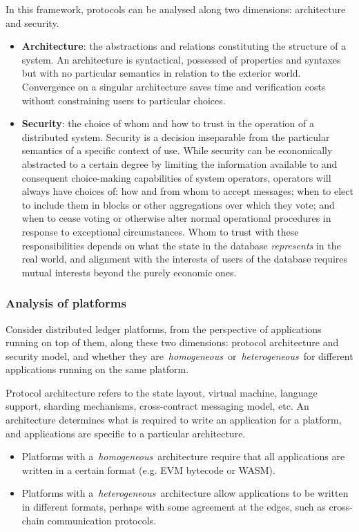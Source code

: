 \documentclass[
    9pt,            %
    commun,        %
    affiltop,       %
]{art}
\begin{document}
In this framework, protocols can be analysed along two dimensions:
architecture and security.

\begin{itemize}
\item
  \textbf{Architecture}: the abstractions and relations constituting the
  structure of a system. An architecture is syntactical, possessed of
  properties and syntaxes but with no particular semantics in relation to
  the exterior world. Convergence on a singular architecture saves time and
  verification costs without constraining users to particular choices.
\item
  \textbf{Security}: the choice of whom and how to trust in the operation
  of a distributed system. Security is a decision inseparable from the
  particular semantics of a specific context of use. While security can be
  economically abstracted to a certain degree by limiting the information
  available to and consequent choice-making capabilities of system
  operators, operators will always have choices of: how and from whom to
  accept messages; when to elect to include them in blocks or other
  aggregations over which they vote; and when to cease voting or otherwise
  alter normal operational procedures in response to exceptional
  circumstances. Whom to trust with these responsibilities depends on what
  the state in the database \emph{represents} in the real world, and
  alignment with the interests of users of the database requires mutual
  interests beyond the purely economic ones.
\end{itemize}

\subsubsection{Analysis of platforms}\label{analysis-of-platforms}

Consider distributed ledger platforms, from the perspective of applications
running on top of them, along these two dimensions: protocol architecture
and security model, and whether they
are~\emph{homogeneous}~or~\emph{heterogeneous}~for different applications
running on the same platform.

Protocol architecture refers to the state layout, virtual machine, language
support, sharding mechanisms, cross-contract messaging model, etc. An
architecture determines what is required to write an application for a
platform, and applications are specific to a particular architecture.

\begin{itemize}

\item
  Platforms with a~\emph{homogeneous}~architecture require that all
  applications are written in a certain format (e.g. EVM bytecode or
  WASM).
\item
  Platforms with a~\emph{heterogeneous}~architecture allow applications
  to be written in different formats, perhaps with some agreement at the
  edges, such as cross-chain communication protocols.
\end{itemize}
\end{document}
